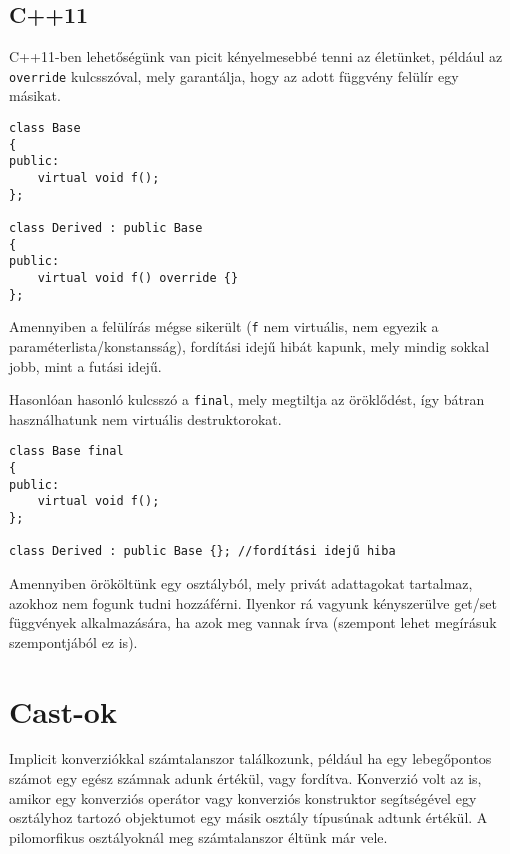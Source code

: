 \documentclass[a4paper,11.5pt,table]{article}
\begin{document}
	\subsection{C++11}
	C++11-ben lehetőségünk van picit kényelmesebbé tenni az életünket, például az \texttt{override} kulcsszóval, mely garantálja, hogy az adott függvény felülír egy másikat.
	\begin{lstlisting}
class Base
{
public:
	virtual void f();
};

class Derived : public Base
{
public:
	virtual void f() override {}
};
	\end{lstlisting}
	Amennyiben a felülírás mégse sikerült (\texttt{f} nem virtuális, nem egyezik a paraméterlista/konstansság), fordítási idejű hibát kapunk, mely mindig sokkal jobb, mint a futási idejű.
	
	\smallskip
	Hasonlóan hasonló kulcsszó a \texttt{final}, mely megtiltja az öröklődést, így bátran használhatunk nem virtuális destruktorokat.
	
	\begin{lstlisting}
class Base final
{
public:
	virtual void f();
};

class Derived : public Base {}; //fordítási idejű hiba
	\end{lstlisting}
	Amennyiben örököltünk egy osztályból, mely privát adattagokat tartalmaz, azokhoz nem fogunk tudni hozzáférni. Ilyenkor rá vagyunk kényszerülve get/set függvények alkalmazására, ha azok meg vannak írva (szempont lehet megírásuk szempontjából ez is).
	\section{Cast-ok}
	Implicit konverziókkal számtalanszor találkozunk, például ha egy lebegőpontos számot egy egész számnak adunk értékül, vagy fordítva. Konverzió volt az is, amikor egy konverziós operátor vagy konverziós konstruktor segítségével egy osztályhoz tartozó objektumot egy másik osztály típusúnak adtunk értékül. A pilomorfikus osztályoknál meg számtalanszor éltünk már vele.
\end{document}
